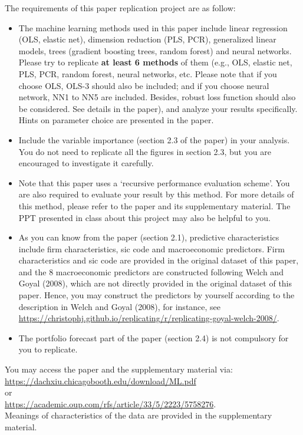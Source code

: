 \documentclass[11pt]{article}
\begin{document}
The requirements of this paper replication project are as follow:
\begin{itemize}
\item The machine learning methods used in this paper include linear regression (OLS, elastic net), dimension reduction (PLS, PCR), generalized linear models, trees (gradient boosting trees, random forest) and neural networks. Please try to replicate \textbf{at least 6 methods} of them (e.g., OLS, elastic net, PLS, PCR, random forest, neural networks, etc. Please note that if you choose OLS, OLS-3 should also be included; and if you choose neural network, NN1 to NN5 are included. Besides, robust loss function should also be considered. See details in the paper), and analyze your results specifically. Hints on parameter choice are presented in the paper.
\item Include the variable importance (section 2.3 of the paper) in your analysis. You do not need to replicate all the figures in section 2.3, but you are encouraged to investigate it carefully.
\item Note that this paper uses a `recursive performance evaluation scheme'. You are also required to evaluate your result by this method. For more details of this method, please refer to the paper and its supplementary material. The PPT presented in class about this project may also be helpful to you.
\item As you can know from the paper (section 2.1), predictive characteristics include firm characteristics, sic code and macroeconomic predictors. Firm characteristics and sic code are provided in the original dataset of this paper, and the 8 macroeconomic predictors are constructed following Welch and Goyal (2008), which are not directly provided in the original dataset of this paper. Hence, you may construct the predictors by yourself according to the description in Welch and Goyal (2008), for instance, see \\
\url{https://christophj.github.io/replicating/r/replicating-goyal-welch-2008/}.
\item The portfolio forecast part of the paper (section 2.4) is not compulsory for you to replicate.
\end{itemize}

You may access the paper and the supplementary material via: \\
\url{https://dachxiu.chicagobooth.edu/download/ML.pdf} \\
or \\
\url{https://academic.oup.com/rfs/article/33/5/2223/5758276}.  \\
Meanings of characteristics of the data are provided in the supplementary material.
\end{document}
